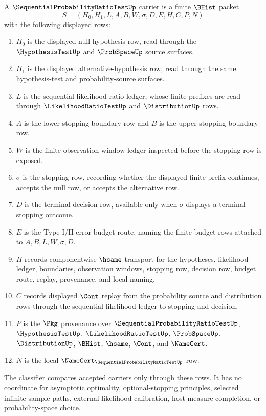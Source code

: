 \begin{definition}
\label{def:sequential-probability-ratio-test-carrier}
A $\SequentialProbabilityRatioTestUp$ carrier is a finite $\BHist$ packet
$$
S=(H_0,H_1,L,A,B,W,\sigma,D,E,H,C,P,N)
$$
with the following displayed rows:
\begin{enumerate}
\item $H_0$ is the displayed null-hypothesis row, read through the $\HypothesisTestUp$ and $\ProbSpaceUp$ source surfaces.
\item $H_1$ is the displayed alternative-hypothesis row, read through the same hypothesis-test and probability-source surfaces.
\item $L$ is the sequential likelihood-ratio ledger, whose finite prefixes are read through $\LikelihoodRatioTestUp$ and $\DistributionUp$ rows.
\item $A$ is the lower stopping boundary row and $B$ is the upper stopping boundary row.
\item $W$ is the finite observation-window ledger inspected before the stopping row is exposed.
\item $\sigma$ is the stopping row, recording whether the displayed finite prefix continues, accepts the null row, or accepts the alternative row.
\item $D$ is the terminal decision row, available only when $\sigma$ displays a terminal stopping outcome.
\item $E$ is the Type I/II error-budget route, naming the finite budget rows attached to $A,B,L,W,\sigma,D$.
\item $H$ records componentwise $\hsame$ transport for the hypotheses, likelihood ledger, boundaries, observation windows, stopping row, decision row, budget route, replay, provenance, and local naming.
\item $C$ records displayed $\Cont$ replay from the probability source and distribution rows through the sequential likelihood ledger to stopping and decision.
\item $P$ is the $\Pkg$ provenance over $\SequentialProbabilityRatioTestUp$, $\HypothesisTestUp$, $\LikelihoodRatioTestUp$, $\ProbSpaceUp$, $\DistributionUp$, $\BHist$, $\hsame$, $\Cont$, and $\NameCert$.
\item $N$ is the local $\NameCert_{\SequentialProbabilityRatioTestUp}$ row.
\end{enumerate}
The classifier compares accepted carriers only through these rows. It has no coordinate for asymptotic optimality, optional-stopping principles, selected infinite sample paths, external likelihood calibration, host measure completion, or probability-space choice.
\end{definition}

